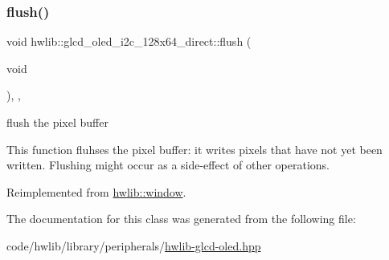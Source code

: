 \subsubsection{\texorpdfstring{flush()}{flush()}}
{\footnotesize\ttfamily void hwlib\+::glcd\+\_\+oled\+\_\+i2c\+\_\+128x64\+\_\+direct\+::flush (\begin{DoxyParamCaption}\item[{void}]{ }\end{DoxyParamCaption})\hspace{0.3cm}{\ttfamily [inline]}, {\ttfamily [override]}, {\ttfamily [virtual]}}



flush the pixel buffer 

This function fluhses the pixel buffer\+: it writes pixels that have not yet been written. Flushing might occur as a side-\/effect of other operations. 

Reimplemented from \hyperlink{classhwlib_1_1window_a2b654a98872d174173e1df24a444c949}{hwlib\+::window}.



The documentation for this class was generated from the following file\+:\begin{DoxyCompactItemize}
\item 
code/hwlib/library/peripherals/\hyperlink{library_2peripherals_2hwlib-glcd-oled_8hpp}{hwlib-\/glcd-\/oled.\+hpp}\end{DoxyCompactItemize}
